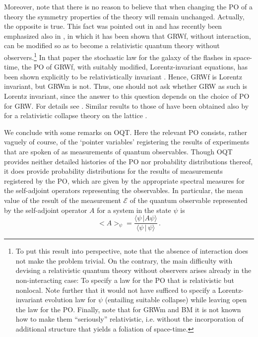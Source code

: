 \documentclass[12pt]{article}
\begin{document}
Moreover, note that there is no reason to believe that when changing the PO of a theory the symmetry properties of the theory will remain unchanged. Actually, the opposite is true.
This fact was pointed out in \citep{Gol98} and has recently been emphasized also in \citep{Tum04}, in which it has been shown that {\sf GRWf}, without interaction, can  
 be modified so as to become a relativistic quantum theory without 
 observers.\footnote{To put this result into perspective, note that the absence of interaction does not make the problem trivial. On the contrary, the main difficulty with devising a relativistic quantum theory without observers arises already in the non-interacting case: To specify a law for the PO that is relativistic but nonlocal. Note further that it would not have sufficed to specify a Lorentz-invariant evolution law for $\psi$ (entailing suitable collapse) while leaving open the law for the PO. Finally, note that for {\sf GRWm} and {\sf BM} it is not known how to 
make them ``seriously'' relativistic, i.e. without the incorporation of
additional structure that yields a foliation of space-time.} In that paper the stochastic law for the galaxy of the flashes in space-time, the PO of {\sf GRWf}, with suitably modified, Lorentz-invariant equations, has been shown explicitly to be relativistically invariant \citep[see also][]{Tum06}. 
Hence, {\sf GRWf} is Lorentz invariant, but {\sf GRWm} is not. Thus, one should not
ask whether {\sf GRW} as such is Lorentz invariant, since the answer to this question depends on
the choice of PO for {\sf GRW}. For details see \citep{Mau05}. 
Similar results to those of \citep{Tum04} have been obtained also by \citet{Fay02}
for a relativistic collapse theory on the lattice \citep[see also][]{Fay03,Fay04}.

We conclude with some remarks on {\sf OQT}.  Here the relevant PO {consists, rather vaguely of course,} of the `pointer variables' registering the results of experiments that are spoken of as measurements of quantum observables. Though {\sf OQT} provides neither {detailed histories of the PO} nor probability distributions thereof,
it does provide probability distributions  for the results of measurements registered by the 
PO, which are  given by the appropriate spectral measures for the self-adjoint operators representing the observables. In particular, the mean value of the result of the measurement $\mathcal{E}$ of the quantum observable represented by the self-adjoint operator $A$ for a system 
in the state $\psi$ is
\begin{equation} <A>_{\psi} =  \frac{\langle \psi\,| A\psi\rangle}{\langle\psi\,|\,\psi\rangle}\,.
\label{meanvs}
\end{equation}
\end{document}
